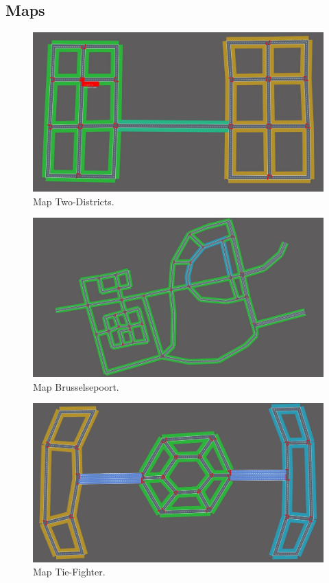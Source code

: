 \documentclass[11pt]{article}
\begin{document}
{\tiny\printbibliography}


\clearpage
\raggedbottom
\appendix
\begin{appendix}
\section{Maps}
\begin{figure}[h]
	\includegraphics[width=\linewidth]{img/twodistr.jpeg}
	\caption{Map Two-Districts.}
\end{figure}

\begin{figure}[h]
	\includegraphics[width=\linewidth]{img/maas.jpeg}
	\caption{Map Brusselsepoort.}
\end{figure}

\begin{figure}[h]
	\includegraphics[width=\linewidth]{img/tie.jpeg}
	\caption{Map Tie-Fighter.}
\end{figure}


\end{appendix}
\end{document}
